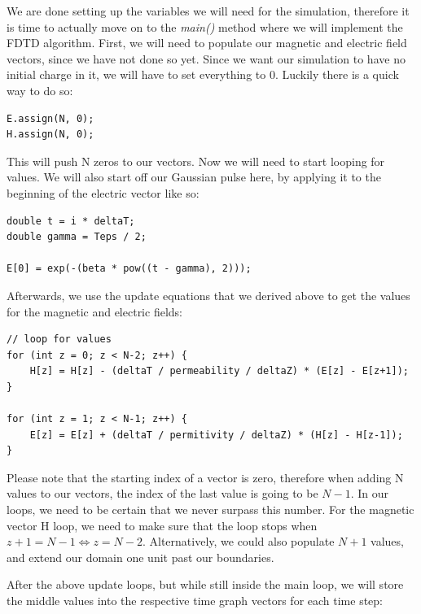 We are done setting up the variables we will need for the simulation, therefore it is time to actually move on to the \textit{main()} method where we will implement the FDTD algorithm. First, we will need to populate our magnetic and electric field vectors, since we have not done so yet. Since we want our simulation to have no initial charge in it, we will have to set everything to $0$. Luckily there is a quick way to do so:

\begin{verbatim}
E.assign(N, 0);
H.assign(N, 0);
\end{verbatim}

This will push N zeros to our vectors. Now we will need to start looping for  values. We will also start off our Gaussian pulse here, by applying it to the beginning of the electric vector like so:

\begin{verbatim}
double t = i * deltaT;
double gamma = Teps / 2;

E[0] = exp(-(beta * pow((t - gamma), 2)));
\end{verbatim}

Afterwards, we use the update equations that we derived above to get the values for the magnetic and electric fields:

\begin{verbatim}
// loop for values
for (int z = 0; z < N-2; z++) {
	H[z] = H[z] - (deltaT / permeability / deltaZ) * (E[z] - E[z+1]);
}

for (int z = 1; z < N-1; z++) {
	E[z] = E[z] + (deltaT / permitivity / deltaZ) * (H[z] - H[z-1]);
}
\end{verbatim}

Please note that the starting index of a vector is zero, therefore when adding N values to our vectors, the index of the last value is going to be $N-1$. In our loops, we need to be certain that we never surpass this number. For the magnetic vector H loop, we need to make sure that the loop stops when $z + 1 = N - 1 \Leftrightarrow z = N - 2$. Alternatively, we could also populate $N + 1$ values, and extend our domain one unit past our boundaries.

After the above update loops, but while still inside the main loop, we will store the middle values into the respective time graph vectors for each time step:

